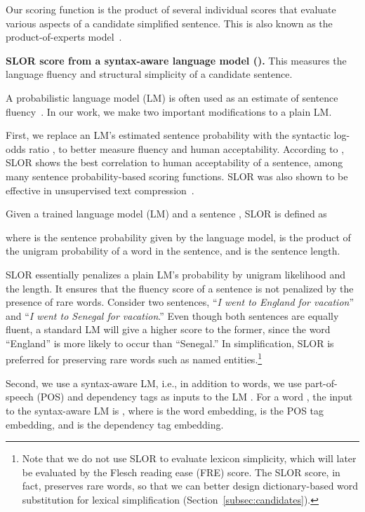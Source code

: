 \documentclass[11pt,a4paper]{article}
\begin{document}
Our scoring function is the product of several individual scores that evaluate various aspects of a candidate simplified sentence. This is also known as the product-of-experts model~\cite{hinton2002training}.



\textbf{SLOR score from a syntax-aware language model (}\textbf{).}
This measures the {language fluency} and {structural simplicity} of a candidate sentence.

A probabilistic language model (LM) is often used as an estimate of sentence fluency~\cite{miao2019cgmh}.
In our work, we make two important modifications to a plain LM.


First, we replace an LM's estimated sentence probability with the syntactic log-odds ratio \cite[SLOR,][]{pauls2012large}, to better measure fluency and human acceptability.
According to , SLOR shows the best correlation to human acceptability of a sentence, among many sentence probability-based scoring functions. SLOR was also shown to be effective in unsupervised text compression~\cite{kann2018sentence}.

Given a trained language model (LM) and a sentence , SLOR is defined as 

where  is the sentence probability given by the language model,  is the product of the unigram probability of a word  in the sentence, and  is the sentence length.


SLOR essentially penalizes a plain LM's probability by unigram likelihood and the length. 
It ensures that the fluency score of a sentence is not penalized by the presence of rare words. Consider two sentences, ``\textit{I went to England for vacation}'' and ``\textit{I went to Senegal for vacation}.'' Even though both sentences are equally fluent, a standard LM will give a higher score to the former, since the word ``England'' is more likely to occur than ``Senegal.''
In simplification, SLOR is preferred for preserving rare words such as named entities.\footnote{Note that we do not use SLOR to evaluate lexicon simplicity, which will later be evaluated by the Flesch reading ease (FRE) score. The SLOR score, in fact, preserves rare words, so that we can better design dictionary-based word substitution for lexical simplification (Section~\ref{subsec:candidates}).}


Second, we use a syntax-aware LM, i.e., in addition to words, we use part-of-speech (POS) and dependency tags as inputs to the LM \cite{zhao2018language}. For a word , the input to the syntax-aware LM is , where  is the word embedding,  is the POS tag embedding, and  is the dependency tag embedding.
\end{document}
